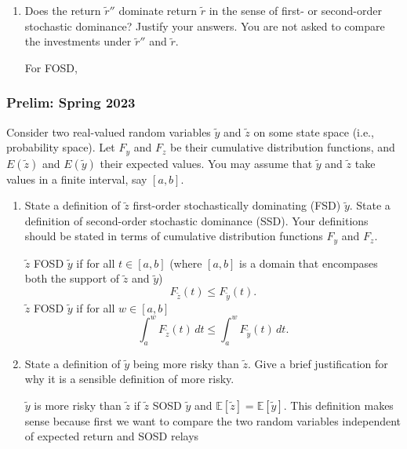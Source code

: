 \documentclass[11pt,english]{article}
\begin{document}
\begin{enumerate}
    \item[(d)] Does the return $\tilde{r}''$ dominate return $\tilde{r}$ in the
        sense of first- or second-order stochastic dominance? Justify your
        answers.
You are not asked to compare the investments under $\tilde{r}''$ and
$\tilde{r}$.

    \begin{solution}
 For FOSD, 
    \end{solution}
\end{enumerate}
 

\subsubsection{Prelim: Spring 2023}\label{Werner Prelim: Spring 2023}
Consider two real-valued random variables $\tilde{y}$ and $\tilde{z}$ on some
state space (i.e., probability space). Let $F_y$ and $F_z$ be their cumulative
distribution functions, and $E(\tilde{z})$ and $E(\tilde{y})$ their expected
values. You may assume that $\tilde{y}$ and $\tilde{z}$ take values in a
finite interval, say $[a, b]$.
 
\begin{enumerate}
    \item[(1)] State a definition of $\tilde{z}$ first-order stochastically
        dominating (FSD) $\tilde{y}$. State a definition of second-order
        stochastic dominance (SSD). Your definitions should be stated in terms
        of cumulative distribution functions $F_y$ and $F_z$.
    \begin{solution}
 $\tilde{z}$ FOSD $\tilde{y}$ if for all $t\in [a,b]$ (where $[a,b]$ is a domain that encompases both the support of $\tilde{z}$ and $\tilde{y}$) $$F_{\tilde{z}}(t) \leq F_{\tilde{y}}(t).$$ $\tilde{z}$ FOSD $\tilde{y}$ if for all $w\in [a,b]$ $$\int_a^w F_{\tilde{z}}(t)\,dt \leq \int_a^w F_{\tilde{y}}(t)\,dt.$$
    \end{solution}
 
    \item[(2)] State a definition of $\tilde{y}$ being more risky than
        $\tilde{z}$. Give a brief justification for why it is a sensible
        definition of more risky.
    \begin{solution}
 $\tilde{y}$ is more risky than $\tilde{z}$ if $\tilde{z}$ SOSD $\tilde{y}$ and $\mathbb{E}[\tilde{z}] = \mathbb{E}[\tilde{y}]$. This definition makes sense because first we want to compare the two random variables independent of expected return and SOSD relays  
    \end{solution}
\end{enumerate}
 
\end{document}
